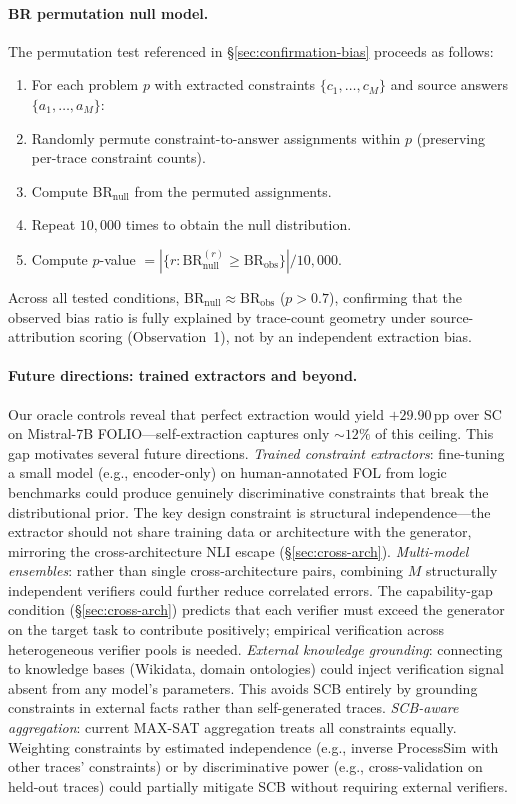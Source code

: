 \paragraph{BR permutation null model.}
\label{app:br-permutation}
The permutation test referenced in \S\ref{sec:confirmation-bias} proceeds as follows:
\begin{enumerate}[nosep,leftmargin=*]
\item For each problem $p$ with extracted constraints $\{c_1, \ldots, c_M\}$ and source answers $\{a_1, \ldots, a_M\}$:
\item Randomly permute constraint-to-answer assignments within $p$ (preserving per-trace constraint counts).
\item Compute $\text{BR}_\text{null}$ from the permuted assignments.
\item Repeat $10{,}000$ times to obtain the null distribution.
\item Compute $p$-value $= |\{r : \text{BR}_\text{null}^{(r)} \geq \text{BR}_\text{obs}\}| / 10{,}000$.
\end{enumerate}
Across all tested conditions, $\text{BR}_\text{null} \approx \text{BR}_\text{obs}$ ($p > 0.7$), confirming that the observed bias ratio is fully explained by trace-count geometry under source-attribution scoring (Observation~1), not by an independent extraction bias.

\paragraph{Future directions: trained extractors and beyond.}
\label{app:future-directions}
Our oracle controls reveal that perfect extraction would yield $+29.90$\,pp over SC on Mistral-7B FOLIO---self-extraction captures only ${\sim}12\%$ of this ceiling. This gap motivates several future directions.
\emph{Trained constraint extractors}: fine-tuning a small model (e.g., encoder-only) on human-annotated FOL from logic benchmarks could produce genuinely discriminative constraints that break the distributional prior. The key design constraint is structural independence---the extractor should not share training data or architecture with the generator, mirroring the cross-architecture NLI escape (\S\ref{sec:cross-arch}).
\emph{Multi-model ensembles}: rather than single cross-architecture pairs, combining $M$ structurally independent verifiers could further reduce correlated errors. The capability-gap condition (\S\ref{sec:cross-arch}) predicts that each verifier must exceed the generator on the target task to contribute positively; empirical verification across heterogeneous verifier pools is needed.
\emph{External knowledge grounding}: connecting to knowledge bases (Wikidata, domain ontologies) could inject verification signal absent from any model's parameters. This avoids SCB entirely by grounding constraints in external facts rather than self-generated traces.
\emph{SCB-aware aggregation}: current MAX-SAT aggregation treats all constraints equally. Weighting constraints by estimated independence (e.g., inverse ProcessSim with other traces' constraints) or by discriminative power (e.g., cross-validation on held-out traces) could partially mitigate SCB without requiring external verifiers.

